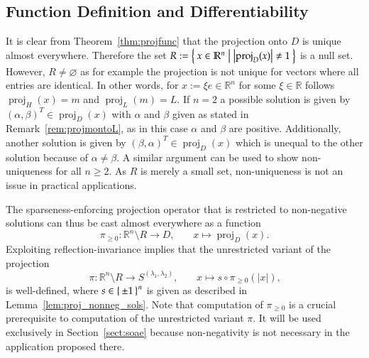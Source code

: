 \documentclass[twoside,11pt]{article}
\DeclareMathOperator{\proj}{proj}
\DeclareMathOperator{\hada}{\circ}
\newcommand{\R}{\mathbb{R}}
\newcommand{\0}{\mathcal{O}}
\newcommand{\transp}{^T}
\newcommand{\abs}[1]{\left\vert #1 \right\vert}
\renewcommand{\emptyset}{\varnothing}
\begin{document}
\subsection{Function Definition and Differentiability}
\label{sect:projfunc_differentiability}
It is clear from Theorem~\ref{thm:projfunc} that the projection onto $D$ is unique almost everywhere.
Therefore the set $R := \Set{x\in\R^n | \abs{\proj_D(x)} \neq 1}$ is a null set.
However, $R\neq\emptyset$ as for example the projection is not unique for vectors where all entries are identical.
In other words, for $x := \xi e\in\R^n$ for some $\xi\in\R$ follows $\proj_H(x) = m$ and $\proj_L(m) = L$.
If $n = 2$ a possible solution is given by $\left(\alpha, \beta\right)\transp\in\proj_D(x)$ with $\alpha$ and $\beta$ given as stated in Remark~\ref{rem:projmontoL}, as in this case $\alpha$ and $\beta$ are positive.
Additionally, another solution is given by $\left(\beta, \alpha\right)\transp\in\proj_D(x)$ which is unequal to the other solution because of $\alpha\neq\beta$.
A similar argument can be used to show non-uniqueness for all $n\geq 2$.
As $R$ is merely a small set, non-uniqueness is not an issue in practical applications.

The sparseness-enforcing projection operator that is restricted to non-negative solutions can thus be cast almost everywhere as a function
\begin{displaymath}
  \pi_{\geq 0}\colon\R^n\setminus R\to D\text{,}\qquad x\mapsto\proj_D(x)\text{.}
\end{displaymath}
Exploiting reflection-invariance implies that the unrestricted variant of the projection
\begin{displaymath}
  \pi\colon\R^n\setminus R\to S^{(\lambda_1,\lambda_2)}\text{,}\qquad x\mapsto s\hada\pi_{\geq 0}\left(\abs{x}\right)\text{,}
\end{displaymath}
is well-defined, where $s\in\set{\pm 1}^n$ is given as described in Lemma~\ref{lem:proj_nonneg_sols}.
Note that computation of $\pi_{\geq 0}$ is a crucial prerequisite to computation of the unrestricted variant $\pi$.
It will be used exclusively in Section~\ref{sect:soae} because non-negativity is not necessary in the application proposed there.
\end{document}

